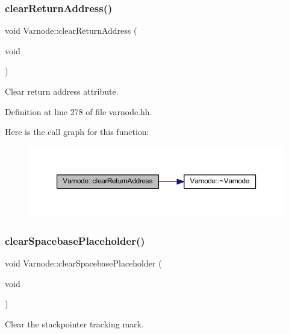 \subsubsection{\texorpdfstring{clearReturnAddress()}{clearReturnAddress()}}
{\footnotesize\ttfamily void Varnode\+::clear\+Return\+Address (\begin{DoxyParamCaption}\item[{void}]{ }\end{DoxyParamCaption})\hspace{0.3cm}{\ttfamily [inline]}}



Clear return address attribute. 



Definition at line 278 of file varnode.\+hh.

Here is the call graph for this function\+:
\nopagebreak
\begin{figure}[H]
\begin{center}
\leavevmode
\includegraphics[width=350pt]{class_varnode_ad4d387ef43c2d52914b52bc428ba436b_cgraph}
\end{center}
\end{figure}
\mbox{\label{class_varnode_a8aa3f1ceca4a8406fadce9915c31254f}} 
\subsubsection{\texorpdfstring{clearSpacebasePlaceholder()}{clearSpacebasePlaceholder()}}
{\footnotesize\ttfamily void Varnode\+::clear\+Spacebase\+Placeholder (\begin{DoxyParamCaption}\item[{void}]{ }\end{DoxyParamCaption})\hspace{0.3cm}{\ttfamily [inline]}}



Clear the stackpointer tracking mark. 



